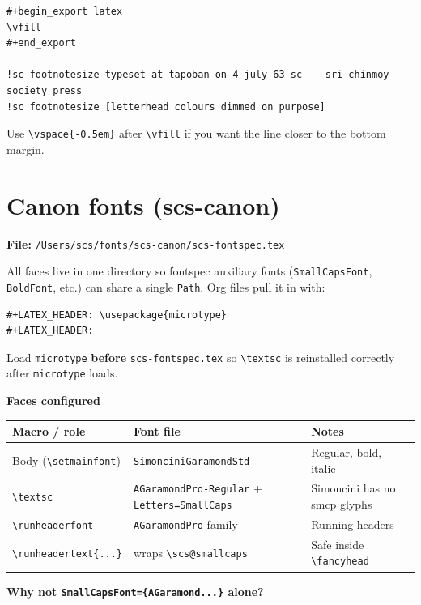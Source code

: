 \documentclass[11pt]{article}
\begin{document}
\begin{verbatim}
#+begin_export latex
\vfill
#+end_export

!sc footnotesize typeset at tapoban on 4 july 63 sc -- sri chinmoy society press
!sc footnotesize [letterhead colours dimmed on purpose]
\end{verbatim}

Use \texttt{\textbackslash{}vspace\{-0.5em\}} after \texttt{\textbackslash{}vfill} if you want the line closer to the
bottom margin.
\section*{Canon fonts (scs-canon)}
\label{sec:orga372174}

\textbf{\textbf{File:}} \texttt{/Users/scs/fonts/scs-canon/scs-fontspec.tex}

All faces live in one directory so fontspec auxiliary fonts (\texttt{SmallCapsFont},
\texttt{BoldFont}, etc.) can share a single \texttt{Path}.  Org files pull it in with:

\begin{verbatim}
#+LATEX_HEADER: \usepackage{microtype}
#+LATEX_HEADER: 
\end{verbatim}

Load \texttt{microtype} \textbf{before} \texttt{scs-fontspec.tex} so \texttt{\textbackslash{}textsc} is reinstalled
correctly after \texttt{microtype} loads.

\textbf{\textbf{Faces configured}}

\begin{center}
\begin{tabular}{lll}
Macro / role & Font file & Notes\\
\hline
Body (\texttt{\textbackslash{}setmainfont}) & \texttt{SimonciniGaramondStd} & Regular, bold, italic\\
\texttt{\textbackslash{}textsc} & \texttt{AGaramondPro-Regular} + \texttt{Letters=SmallCaps} & Simoncini has no smcp glyphs\\
\texttt{\textbackslash{}runheaderfont} & \texttt{AGaramondPro} family & Running headers\\
\texttt{\textbackslash{}runheadertext\{...\}} & wraps \texttt{\textbackslash{}scs@smallcaps} & Safe inside \texttt{\textbackslash{}fancyhead}\\
\end{tabular}
\end{center}

\textbf{\textbf{Why not \texttt{SmallCapsFont=\{AGaramond...\}} alone?}}
\end{document}
